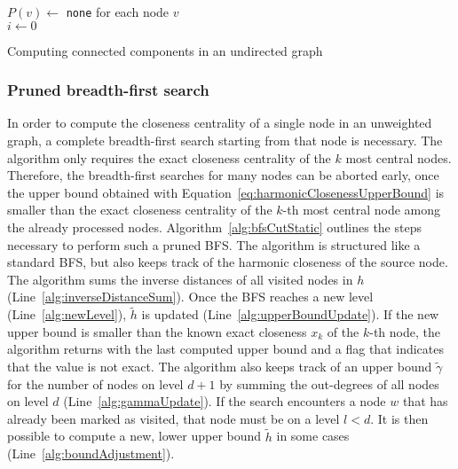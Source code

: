 \begin{algorithm2e}[h!]
 \label{alg:connectedComponents}
 $P(v) \gets$ \texttt{none} for each node $v$ \\
 $i \gets 0$ \\
 
 
 
 \caption{Computing connected components in an undirected graph}
\end{algorithm2e}

\subsubsection{Pruned breadth-first search}
In order to compute the closeness centrality of a single node in an unweighted graph, a complete breadth-first search starting from that node is necessary. The algorithm only requires the exact closeness centrality of the $k$ most central nodes. Therefore, the breadth-first searches for many nodes can be aborted early, once the upper bound obtained with Equation~\ref{eq:harmonicClosenessUpperBound} is smaller than the exact closeness centrality of the $k$-th most central node among the already processed nodes. Algorithm~\ref{alg:bfsCutStatic} outlines the steps necessary to perform such a pruned BFS. The algorithm is structured like a standard BFS, but also keeps track of the harmonic closeness of the source node. The algorithm sums the inverse distances of all visited nodes in $h$ (Line~\ref{alg:inverseDistanceSum}). Once the BFS reaches a new level (Line~\ref{alg:newLevel}), $\widetilde{h}$ is updated (Line~\ref{alg:upperBoundUpdate}). If the new upper bound is smaller than the known exact closeness $x_k$ of the $k$-th node, the algorithm returns with the last computed upper bound and a flag that indicates that the value is not exact. The algorithm also keeps track of an upper bound $\widetilde{\gamma}$ for the number of nodes on level $d + 1$ by summing the out-degrees of all nodes on level $d$ (Line~\ref{alg:gammaUpdate}). If the search encounters a node $w$ that has already been marked as visited, that node must be on a level $l < d$. It is then possible to compute a new, lower upper bound $\widetilde{h}$ in some cases (Line~\ref{alg:boundAdjustment}).

